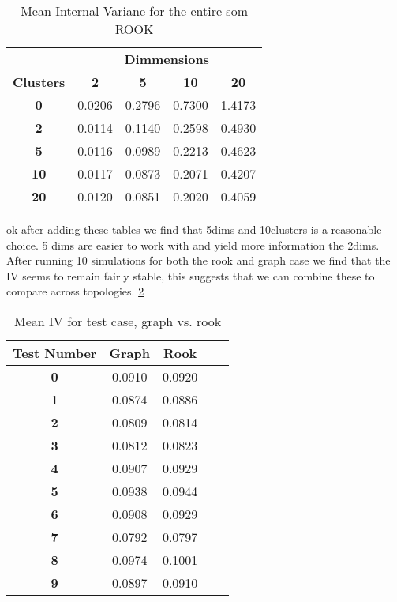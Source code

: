 \begin{table}
\caption{Mean Internal Variane for the entire som ROOK}
\label{ivtable2}
\begin{tabular}{|c||c|c|c|c|}
\hline
&\multicolumn{4}{c|}{\textbf{Dimmensions}}\\
\textbf{Clusters} & \multicolumn{1}{c}{\textbf{2}} &
\multicolumn{1}{c}{\textbf{5}} & \multicolumn{1}{c}{\textbf{10}} &
\multicolumn{1}{c|}{\textbf{20}}\\
\hline
\hline
\textbf{0} & 0.0206& 0.2796& 0.7300& 1.4173 \\
\hline
\textbf{2} & 0.0114& 0.1140& 0.2598& 0.4930 \\
\hline
\textbf{5} & 0.0116& 0.0989& 0.2213& 0.4623 \\
\hline
\textbf{10} & 0.0117& 0.0873& 0.2071& 0.4207 \\
\hline
\textbf{20} & 0.0120& 0.0851& 0.2020& 0.4059 \\
\hline
\end{tabular} \end{table}



ok after adding these tables we find that 5dims and 10clusters is a reasonable
choice. 5 dims are easier to work with and yield more information the 2dims.
After running 10 simulations for both the rook and graph case we find that the
IV seems to remain fairly stable, this suggests that we can combine these to
compare across topologies.
\ref{ivtable3}

\begin{table}
\caption{Mean IV for test case, graph vs. rook}
\label{ivtable3}
\begin{tabular}{|c||c|c|c|c|}
\hline
\textbf{Test Number} & Graph & Rook \\
\hline
\hline
\textbf{0} & 0.0910 & 0.0920 \\
\hline
\textbf{1} & 0.0874 & 0.0886 \\
\hline
\textbf{2} & 0.0809 & 0.0814 \\
\hline
\textbf{3} & 0.0812 & 0.0823 \\
\hline
\textbf{4} & 0.0907 & 0.0929 \\
\hline
\textbf{5} & 0.0938 & 0.0944 \\
\hline
\textbf{6} & 0.0908 & 0.0929 \\
\hline
\textbf{7} & 0.0792 & 0.0797 \\
\hline
\textbf{8} & 0.0974 & 0.1001 \\
\hline
\textbf{9} & 0.0897 & 0.0910 \\
\hline
\end{tabular} \end{table}


